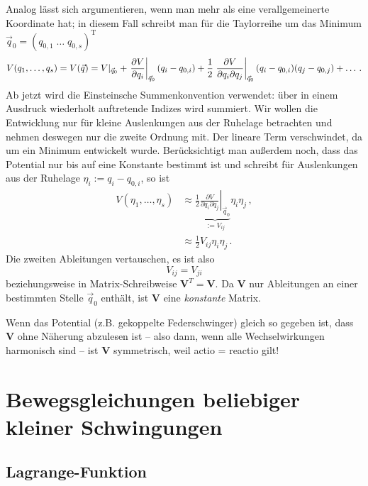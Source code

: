 \documentclass[paper=a4, fontsize=11.0pt, abstractoff, DIV12]{scrartcl}
\begin{document}
Analog lässt sich argumentieren, wenn man mehr als eine
verallgemeinerte Koordinate hat; in diesem Fall schreibt man für die Taylorreihe
um das Minimum $\vec{q}_0 = (q_{0,1}\;\dots\;q_{0,s})^\mathrm{T}$
\begin{equation}
V(q_1, \dots, q_s) = V(\vec q) = V|_{\vec{q}_0} + \left.\firstpderiv{V}{q_i}\right|_{\vec{q}_0} (q_i - q_{0,i}) + \frac{1}{2} \left.\frac{\partial V}{\partial q_i \partial q_j}\right|_{\vec{q}_0} (q_i - q_{0,i}) (q_j - q_{0,j}) + \dots\,.
\end{equation}
Ab jetzt wird die Einsteinsche Summenkonvention verwendet: über in einem Ausdruck wiederholt
auftretende Indizes wird summiert. Wir wollen die Entwicklung nur für kleine
Auslenkungen aus der Ruhelage betrachten und nehmen deswegen nur die zweite
Ordnung mit. Der  lineare Term verschwindet, da um ein Minimum entwickelt
wurde. Berücksichtigt man außerdem noch, dass das Pot\-ential nur bis auf eine
Konstante bestimmt ist und schreibt für Auslenkungen aus der Ruhelage
$\eta_i := q_i - q_{0,i}$, so ist
\begin{align}
V(\eta_1, \dots, \eta_s) &\approx \frac{1}{2} \underbrace{\left.\frac{\partial V}{\partial q_i \partial q_j}\right|_{\vec{q}_0}}_{:= V_{ij}} \eta_i\eta_j \, ,\nonumber\\
&\approx \frac{1}{2} V_{ij} \eta_i\eta_j \, .
\label{eq:Vapprox}
\end{align}
Die zweiten Ableitungen vertauschen, es ist also
\begin{equation}
V_{ij} = V_{ji}
\end{equation}
beziehungsweise in Matrix-Schreibweise $\mathbf{V}^{T} = \mathbf{V}$. Da
$\mathbf V$ nur Ableitungen an einer bestimmten Stelle $\vec q_0$ enthält,
ist $\mathbf V$ eine \emph{konstante} Matrix.

Wenn das Potential (z.B. gekoppelte Federschwinger) gleich so gegeben ist, dass
$\mathbf{V}$ ohne Näherung abzulesen ist -- also dann, wenn alle
Wechselwirkungen harmonisch sind -- ist $\mathbf{V}$ symmetrisch, weil actio =
reactio gilt!

\section{Bewegsgleichungen beliebiger kleiner Schwingungen}

\subsection{Lagrange-Funktion}
\end{document}
